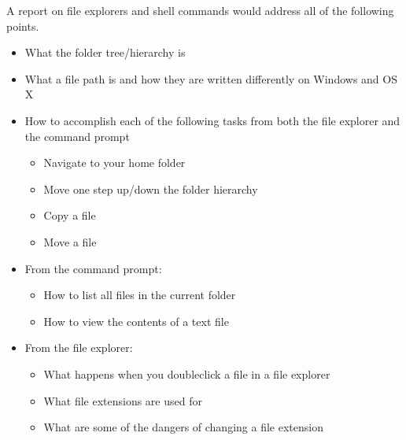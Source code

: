 \documentclass[letterpaper,10pt,english]{jupyterBook}
\begin{document}
\sphinxAtStartPar
A report on file explorers and shell commands would address all of the following points.
\begin{itemize}
\item {} 
\sphinxAtStartPar
What the folder tree/hierarchy is

\item {} 
\sphinxAtStartPar
What a file path is and how they are written differently on Windows and OS X

\item {} 
\sphinxAtStartPar
How to accomplish each of the following tasks from both the file explorer and the command prompt
\begin{itemize}
\item {} 
\sphinxAtStartPar
Navigate to your home folder

\item {} 
\sphinxAtStartPar
Move one step up/down the folder hierarchy

\item {} 
\sphinxAtStartPar
Copy a file

\item {} 
\sphinxAtStartPar
Move a file

\end{itemize}

\item {} 
\sphinxAtStartPar
From the command prompt:
\begin{itemize}
\item {} 
\sphinxAtStartPar
How to list all files in the current folder

\item {} 
\sphinxAtStartPar
How to view the contents of a text file

\end{itemize}

\item {} 
\sphinxAtStartPar
From the file explorer:
\begin{itemize}
\item {} 
\sphinxAtStartPar
What happens when you double\sphinxhyphen{}click a file in a file explorer

\item {} 
\sphinxAtStartPar
What file extensions are used for

\item {} 
\sphinxAtStartPar
What are some of the dangers of changing a file extension

\end{itemize}

\end{itemize}
\end{document}
